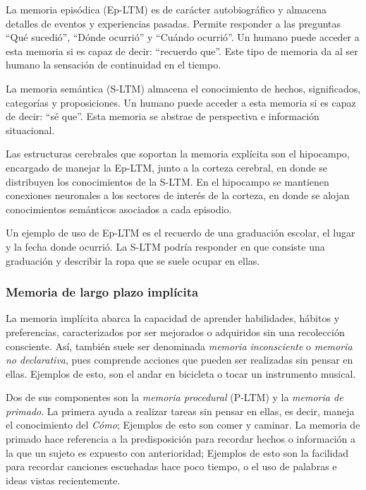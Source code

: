 La memoria episódica (Ep-LTM) es de carácter  autobiográfico y almacena detalles de eventos y experiencias pasadas. Permite responder a las preguntas ``Qué sucedió'', ``Dónde ocurrió'' y ``Cuándo ocurrió''. Un humano puede acceder a esta memoria si es capaz de decir: ``recuerdo que''. Este tipo de memoria da al ser humano la sensación de continuidad en el tiempo.

La memoria semántica (S-LTM) almacena el conocimiento de hechos, significados, categorías y proposiciones. Un humano puede acceder a esta memoria si es capaz de decir: ``sé que''. Esta memoria se abstrae de perspectiva e información situacional.

Las estructuras cerebrales que soportan la memoria explícita son el hipocampo, encargado de manejar la Ep-LTM, junto a la corteza cerebral, en donde se distribuyen los conocimientos de la S-LTM. En el hipocampo se mantienen conexiones neuronales a los sectores de interés de la corteza, en donde se alojan conocimientos semánticos asociados a cada episodio.

Un ejemplo de uso de Ep-LTM es el recuerdo de una graduación escolar, el lugar y la fecha donde ocurrió. La S-LTM podría responder en que consiste una graduación y describir la ropa que se suele ocupar en ellas.


\subsubsection{Memoria de largo plazo implícita}

La memoria implícita  abarca la capacidad de aprender habilidades, hábitos y preferencias, caracterizados por ser mejorados o adquiridos sin una recolección consciente. Así, también suele ser denominada \textit{memoria inconsciente} o \textit{memoria no declarativa}, pues comprende acciones que pueden ser realizadas sin pensar en ellas. Ejemplos de esto, son el andar en bicicleta o tocar un instrumento musical.

Dos de sus componentes son la \textit{memoria procedural} (P-LTM) y la \textit{memoria de primado}. La primera ayuda a realizar tareas sin pensar en ellas, es decir, maneja el conocimiento del \textit{Cómo}; Ejemplos de esto son comer y caminar. La memoria de primado hace referencia a la predisposición para recordar hechos o información a la que un sujeto es expuesto con anterioridad; Ejemplos de esto son la facilidad para recordar canciones escuchadas hace poco tiempo, o el uso de palabras e ideas vistas recientemente.

